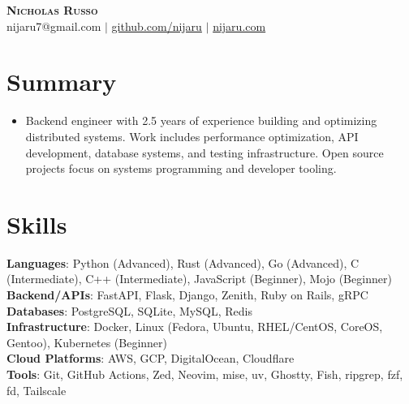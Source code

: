 \documentclass[letterpaper,10pt]{article}
\begin{document}
\begin{center}
    \textbf{\LARGE \scshape Nicholas Russo} \\ \vspace{2pt}
    \small nijaru7@gmail.com $|$
    \href{https://github.com/nijaru}{github.com/nijaru} $|$
    \href{https://nijaru.com}{nijaru.com}
\end{center}
\vspace{-8pt}

\section{Summary}
\begin{itemize}[leftmargin=0.15in, label={}]
    \item
    \setlength{\baselineskip}{14pt}
    Backend engineer with 2.5 years of experience building and optimizing distributed systems. Work includes performance optimization, API development, database systems, and testing infrastructure. Open source projects focus on systems programming and developer tooling.
    \setlength{\baselineskip}{12pt}
\end{itemize}
\vspace{-3pt}

\section{Skills}
\begin{itemize}[leftmargin=0.15in, label={}]
    \small{\item{
     \textbf{Languages}{: Python (Advanced), Rust (Advanced), Go (Advanced), C (Intermediate), C++ (Intermediate), JavaScript (Beginner), Mojo (Beginner)} \\[2pt]
     \textbf{Backend/APIs}{: FastAPI, Flask, Django, Zenith, Ruby on Rails, gRPC} \\[2pt]
     \textbf{Databases}{: PostgreSQL, SQLite, MySQL, Redis} \\[2pt]
     \textbf{Infrastructure}{: Docker, Linux (Fedora, Ubuntu, RHEL/CentOS, CoreOS, Gentoo), Kubernetes (Beginner)} \\[2pt]
     \textbf{Cloud Platforms}{: AWS, GCP, DigitalOcean, Cloudflare} \\[2pt]
     \textbf{Tools}{: Git, GitHub Actions, Zed, Neovim, mise, uv, Ghostty, Fish, ripgrep, fzf, fd, Tailscale}
    }}
\end{itemize}
\end{document}
